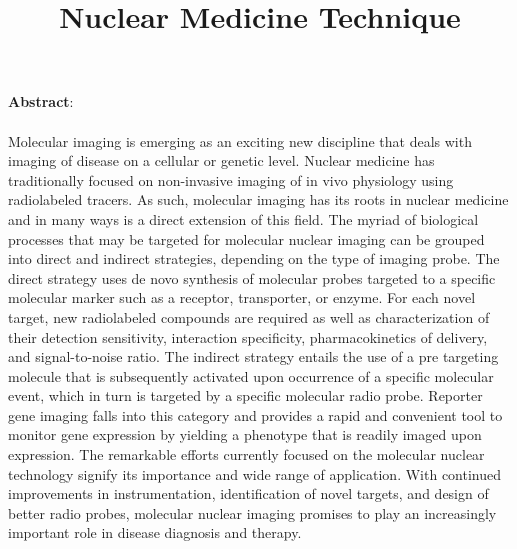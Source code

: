 \documentclass[12pt]{article}
\title{Nuclear Medicine Technique}
\date{}
\begin{document}
\maketitle
\noindent
\textbf{\large Abstract}:\\ \\ \large Molecular imaging is emerging as an exciting new discipline that deals with imaging of disease on a cellular or genetic level. Nuclear medicine has traditionally focused on non-invasive imaging of in vivo physiology using radiolabeled tracers. As such, molecular imaging has its roots in nuclear medicine and in many ways is a direct extension of this field. The myriad of biological processes that may be targeted for molecular nuclear imaging can be grouped into direct and indirect strategies, depending on the type of imaging probe. The direct strategy uses de novo synthesis of molecular probes targeted to a specific molecular marker such as a receptor, transporter, or enzyme. For each novel target, new radiolabeled compounds are required as well as characterization of their detection sensitivity, interaction specificity, pharmacokinetics of delivery, and signal-to-noise ratio. The indirect strategy entails the use of a pre targeting molecule that is subsequently activated upon occurrence of a specific molecular event, which in turn is targeted by a specific molecular radio probe. Reporter gene imaging falls into this category and provides a rapid and convenient tool to monitor gene expression by yielding a phenotype that is readily imaged upon expression. The remarkable efforts currently focused on the molecular nuclear technology signify its importance and wide range of application. With continued improvements in instrumentation, identification of novel targets, and design of better radio probes, molecular nuclear imaging promises to play an increasingly important role in disease diagnosis and therapy.




\end{document}

